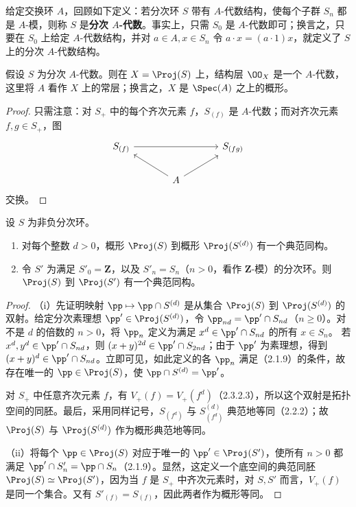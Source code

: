 给定交换环 $A$，回顾如下定义：若分次环 $S$ 带有 $A$-代数结构，使每个子群 $S_n$ 都是 $A$-模，则称 $S$ 是\textbf{分次 $A$-代数}。事实上，只需 $S_0$ 是 $A$-代数即可；换言之，只要在 $S_0$ 上给定 $A$-代数结构，并对 $a\in A,x\in S_n$ 令
$a\cdot x=(a\cdot1)x$，就定义了 $S$ 上的分次 $A$-代数结构。

假设 $S$ 为分次 $A$-代数。则在 $X=\Proj(S)$ 上，结构层 $\OO_X$ 是一个 $A$-代数，这里将 $A$ 看作 $X$ 上的常层；换言之，$X$ 是 $\Spec(A)$ 之上的概形。
\begin{proof}
只需注意：对 $S_+$ 中的每个齐次元素 $f$，$S_{(f)}$ 是 $A$-代数；而对齐次元素 $f,g\in S_+$，图
\[
\begin{tikzcd}[column sep=large]
S_{(f)} \arrow[rr] && S_{(fg)}\\
& A \arrow[ul] \arrow[ur] &
\end{tikzcd}
\]
交换。
\end{proof}

设 $S$ 为非负分次环。
\begin{enumerate}[label=(\roman*)]
\item 对每个整数 $d>0$，概形 $\Proj(S)$ 到概形 $\Proj(S^{(d)})$ 有一个典范同构。
\item 令 $S'$ 为满足 $S'_0=\mathbf Z$，以及 $S'_n=S_n$（$n>0$，看作 $\mathbf Z$-模）的分次环。则 $\Proj(S)$ 到 $\Proj(S')$ 有一个典范同构。
\end{enumerate}
\begin{proof}
（i）先证明映射 $\pp\mapsto\pp\cap S^{(d)}$ 是从集合 $\Proj(S)$ 到 $\Proj(S^{(d)})$ 的双射。给定分次素理想 $\pp'\in\Proj(S^{(d)})$，令
$\pp_{nd}=\pp'\cap S_{nd}$（$n\geq0$）。对不是 $d$ 的倍数的 $n>0$，将 $\pp_n$ 定义为满足 $x^d\in\pp'\cap S_{nd}$ 的所有 $x\in S_n$。
若 $x^d,y^d\in\pp'\cap S_{nd}$，则 $(x+y)^{2d}\in\pp'\cap S_{2nd}$；由于 $\pp'$ 为素理想，得到 $(x+y)^d\in\pp'\cap S_{nd}$。立即可见，如此定义的各 $\pp_n$ 满足（2.1.9）的条件，故存在唯一的 $\pp\in\Proj(S)$，使 $\pp\cap S^{(d)}=\pp'$。

对 $S_+$ 中任意齐次元素 $f$，有 $V_+(f)=V_+(f^d)$（2.3.2.3），所以这个双射是拓扑空间的同胚。最后，采用同样记号，$S_{(f^d)}$ 与 $S^{(d)}_{(f^d)}$ 典范地等同（2.2.2）；故 $\Proj(S)$ 与 $\Proj(S^{(d)})$ 作为概形典范地等同。

（ii）将每个 $\pp\in\Proj(S)$ 对应于唯一的 $\pp'\in\Proj(S')$，使所有 $n>0$ 都满足 $\pp'\cap S'_n=\pp\cap S_n$（2.1.9）。显然，这定义一个底空间的典范同胚
$\Proj(S)\simeq\Proj(S')$，因为当 $f$ 是 $S_+$ 中齐次元素时，对 $S,S'$ 而言，$V_+(f)$ 是同一个集合。又有 $S'_{(f)}=S_{(f)}$，因此两者作为概形等同。
\end{proof}

